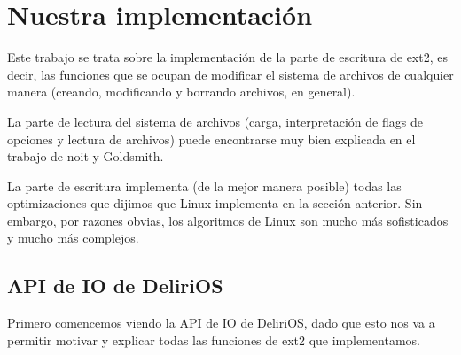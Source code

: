 \newpage
\section{Nuestra implementación}

Este trabajo se trata sobre la implementación de la parte de escritura de ext2, es decir, las funciones que se ocupan de modificar el sistema de archivos de cualquier manera (creando, modificando y borrando archivos, en general). 

La parte de lectura del sistema de archivos (carga, interpretación de flags de opciones y lectura de archivos) puede encontrarse muy bien explicada en el trabajo de noit y Goldsmith.


La parte de escritura implementa (de la mejor manera posible) todas las optimizaciones que dijimos que Linux implementa en la sección anterior. Sin embargo, por razones obvias, los algoritmos de Linux son mucho más sofisticados y mucho más complejos.


\subsection{API de IO de DeliriOS}

Primero comencemos viendo la API de IO de DeliriOS, dado que esto nos va a permitir motivar y explicar todas las funciones de ext2 que implementamos.


